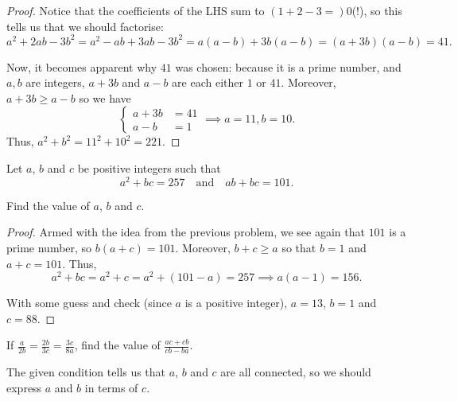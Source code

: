 \documentclass[../jarvis.tex]{subfiles}
\begin{document}
\begin{proof}
    Notice that the coefficients of the LHS sum to $(1+2-3=)0$(!), so this tells us that we should factorise:
$$a^2+2ab-3b^2=a^2-ab+3ab-3b^2=a(a-b)+3b(a-b)=(a+3b)(a-b)=41.$$

Now, it becomes apparent why $41$ was chosen: because it is a prime number, and $a,b$ are integers, $a+3b$ and $a-b$ are each either $1$ or $41$. Moreover, $a+3b \geq a-b$ so we have
$$
\begin{cases}
    a+3b&=41 \\
    a-b&=1
\end{cases} \implies a=11, b=10.
$$
Thus, $a^2+b^2=11^2+10^2=\boxed{221}$.
\end{proof}


\begin{example}[2017 SMO(J) P20]
    Let $a$, $b$ and $c$ be positive integers such that
    $$a^2+bc=257\quad\text{and}\quad ab+bc=101.$$

    Find the value of $a$, $b$ and $c$.
\end{example}
\begin{proof}
    Armed with the idea from the previous problem, we see again that $101$ is a prime number, so $b(a+c)=101$. Moreover, $b+c\geq a$ so that $b=1$ and $a+c=101$. Thus, $$a^2+bc=a^2+c=a^2+(101-a)=257 \implies a(a-1)=156.$$

    With some guess and check (since $a$ is a positive integer), $a=13$, $b=1$ and $c=88$.
\end{proof}


\begin{example}[2016 SMO(J) P24]
    If $\frac{a}{2b}=\frac{2b}{3c}=\frac{3c}{8a}$, find the value of $\frac{ac+cb}{cb-ba}.$
\end{example}
The given condition tells us that $a$, $b$ and $c$ are all connected, so we should express $a$ and $b$ in terms of $c$.
\end{document}
